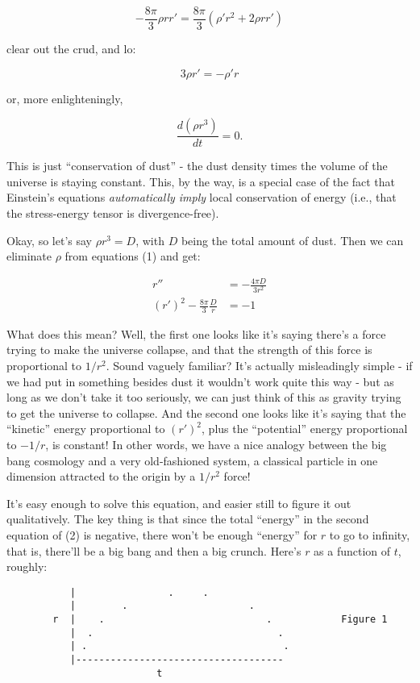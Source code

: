 \documentclass{article}
\begin{document}
\[-\frac{8\pi}{3} \rho r r' = \frac{8\pi}{3}(\rho' r^2 + 2 \rho r r')\]

clear out the crud, and lo:

\[3 \rho r' = - \rho' r\]

or, more enlighteningly,

\[\frac{d(\rho r^3)}{dt} = 0.\]

This is just ``conservation of dust'' - the dust density times the
volume of the universe is staying constant. This, by the way, is a
special case of the fact that Einstein's equations \emph{automatically
imply} local conservation of energy (i.e., that the stress-energy tensor
is divergence-free).

Okay, so let's say \(\rho r^3 = D\), with \(D\) being the total amount
of dust. Then we can eliminate \(\rho\) from equations (1) and get:

\[\begin{aligned}r'' &= -\frac{4\pi D}{3r^2} \\ (r')^2-\frac{8\pi}{3}\frac{D}{r} &= -1 \end{aligned}\tag{2}\]

What does this mean? Well, the first one looks like it's saying there's
a force trying to make the universe collapse, and that the strength of
this force is proportional to \(1/r^2\). Sound vaguely familiar? It's
actually misleadingly simple - if we had put in something besides dust
it wouldn't work quite this way - but as long as we don't take it too
seriously, we can just think of this as gravity trying to get the
universe to collapse. And the second one looks like it's saying that the
``kinetic'' energy proportional to \((r')^2\), plus the ``potential''
energy proportional to \(-1/r\), is constant! In other words, we have a
nice analogy between the big bang cosmology and a very old-fashioned
system, a classical particle in one dimension attracted to the origin by
a \(1/r^2\) force!

It's easy enough to solve this equation, and easier still to figure it
out qualitatively. The key thing is that since the total ``energy'' in
the second equation of (2) is negative, there won't be enough ``energy''
for \(r\) to go to infinity, that is, there'll be a big bang and then a
big crunch. Here's \(r\) as a function of \(t\), roughly:

\begin{verbatim}
           |                .     .
           |        .                     .
        r  |    .                            .            Figure 1
           |  .                                .
           | .                                  .
           |------------------------------------
                          t
\end{verbatim}
\end{document}
